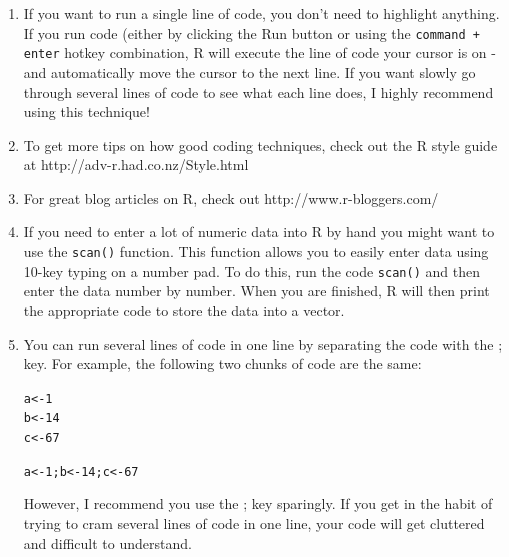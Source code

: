 \documentclass{tufte-book}\usepackage[]{graphicx}\usepackage[]{color}
\makeatletter
\newcommand{\hlnum}[1]{\textcolor[rgb]{0.686,0.059,0.569}{#1}}%
\newcommand{\hlstd}[1]{\textcolor[rgb]{0.345,0.345,0.345}{#1}}%
\newcommand{\hlkwb}[1]{\textcolor[rgb]{0.69,0.353,0.396}{#1}}%
\newenvironment{kframe}{%
 \def\at@end@of@kframe{}%
 \ifinner\ifhmode%
  \def\at@end@of@kframe{\end{minipage}}%
  \begin{minipage}{\columnwidth}%
 \fi\fi%
 \def\FrameCommand##1{\hskip\@totalleftmargin \hskip-\fboxsep
 \colorbox{shadecolor}{##1}\hskip-\fboxsep
     \hskip-\linewidth \hskip-\@totalleftmargin \hskip\columnwidth}%
 \MakeFramed {\advance\hsize-\width
   \@totalleftmargin\z@ \linewidth\hsize
   \@setminipage}}%
 {\par\unskip\endMakeFramed%
 \at@end@of@kframe}
\newenvironment{knitrout}{}{} %
\makeatother
\begin{document}
\begin{enumerate}
  \item If you want to run a single line of code, you don't need to highlight anything. If you run code (either by clicking the Run button or using the \texttt{command + enter} hotkey combination, R will execute the line of code your cursor is on - and automatically move the cursor to the next line. If you want slowly go through several lines of code to see what each line does, I highly recommend using this technique!
  \item To get more tips on how good coding techniques, check out the R style guide at http://adv-r.had.co.nz/Style.html
  \item For great blog articles on R, check out http://www.r-bloggers.com/
  \item If you need to enter a lot of numeric data into R by hand you might want to use the \texttt{scan()} function. This function allows you to easily enter data using 10-key typing on a number pad. To do this, run the code \texttt{scan()} and then enter the data number by number. When you are finished, R will then print the appropriate code to store the data into a vector.
  \item You can run several lines of code in one line by separating the code with the ; key. For example, the following two chunks of code are the same:
  
\begin{knitrout}
\color{fgcolor}\begin{kframe}
\begin{alltt}
\hlstd{a} \hlkwb{<-} \hlnum{1}
\hlstd{b} \hlkwb{<-} \hlnum{14}
\hlstd{c} \hlkwb{<-} \hlnum{67}
\end{alltt}
\end{kframe}
\end{knitrout}

\begin{knitrout}
\color{fgcolor}\begin{kframe}
\begin{alltt}
\hlstd{a} \hlkwb{<-} \hlnum{1} \hlstd{; b} \hlkwb{<-} \hlnum{14} \hlstd{; c} \hlkwb{<-} \hlnum{67}
\end{alltt}
\end{kframe}
\end{knitrout}

  
  However, I recommend you use the ; key sparingly. If you get in the habit of trying to cram several lines of code in one line, your code will get cluttered and difficult to understand.

\end{enumerate}
\end{document}
